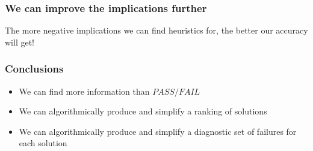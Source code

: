 \documentclass[svgnames,14pt]{beamer}
\newcommand\fail{\mathit{FAIL}}
\newcommand\pass{\mathit{PASS}}
\theoremstyle{definition}
\begin{document}
\begin{frame}
\frametitle{We can improve the implications further}
The more negative implications we can find heuristics for, the better our accuracy will get!
\end{frame}

\begin{frame}
\frametitle{Conclusions}
\begin{itemize}
\item We can find more information than $\pass/\fail$
\item We can algorithmically produce and simplify a ranking of solutions
\item We can algorithmically produce and simplify a diagnostic set of failures for each solution
\end{itemize}
\end{frame}
\end{document}
